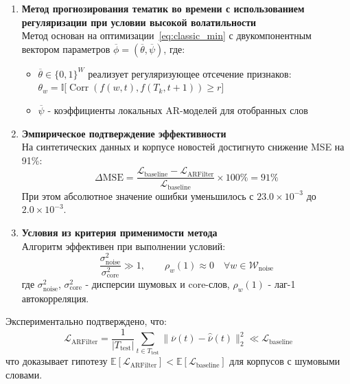 \documentclass[14pt,a4paper]{article}
\begin{document}
\begin{enumerate}
    \item \textbf{Метод прогнозирования тематик во времени с использованием регуляризации при условии высокой волатильности}\\
    Метод основан на оптимизации~\eqref{eq:classic_min} с двукомпонентным вектором параметров \(\overline{\phi} = (\overline{\theta}, \overline{\psi})\), где:
    \begin{itemize}
        \item \(\overline{\theta} \in \{0,1\}^{W}\) реализует регуляризующее отсечение признаков: \(\theta_w = \mathbb{I}\bigl[\operatorname{Corr}(f(w,t), f(T_k,t+1)) \geq r\bigr]\)
        \item \(\overline{\psi}\) - коэффициенты локальных AR-моделей для отобранных слов
    \end{itemize}
    
    \item \textbf{Эмпирическое подтверждение эффективности}\\
    На синтетических данных и корпусе новостей достигнуто снижение MSE на 91\%:
    \[
    \Delta\mathrm{MSE} = \frac{\mathcal{L}_{\mathrm{baseline}} - \mathcal{L}_{\mathrm{ARFilter}}}{\mathcal{L}_{\mathrm{baseline}}} \times 100\% = 91\%
    \]
    При этом абсолютное значение ошибки уменьшилось с \(23.0 \times 10^{-3}\) до \(2.0 \times 10^{-3}\).
    
    \item \textbf{Условия из критерия применимости метода}\\
    Алгоритм эффективен при выполнении условий:
    \[
    \frac{\sigma_{\mathrm{noise}}^{2}}{\sigma_{\mathrm{core}}^{2}} \gg 1, \qquad
    \rho_{w}(1) \approx 0 \quad \forall w \in \mathcal{W}_{\mathrm{noise}}
    \]
    где \(\sigma_{\mathrm{noise}}^{2}\), \(\sigma_{\mathrm{core}}^{2}\) - дисперсии шумовых и core-слов, \(\rho_w(1)\) - лаг-1 автокорреляция.
\end{enumerate}

Экспериментально подтверждено, что:
\[
\mathcal{L}_{\mathrm{ARFilter}} = \frac{1}{|T_{\mathrm{test}}|}\sum_{t\in T_{\mathrm{test}}} \|\overline{\nu}(t) - \widehat{\overline{\nu}}(t)\|_2^2 \ll \mathcal{L}_{\mathrm{baseline}}
\]
что доказывает гипотезу \(\mathbb{E}[\mathcal{L}_{\mathrm{ARFilter}}] < \mathbb{E}[\mathcal{L}_{\mathrm{baseline}}]\) для корпусов с шумовыми словами.
\end{document}
